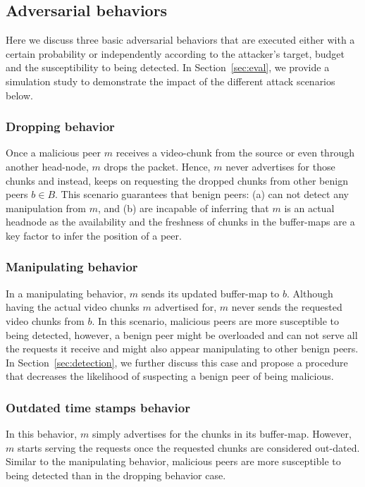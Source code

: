 \subsection{Adversarial behaviors}
Here we discuss three basic adversarial behaviors that are executed either with a certain probability or independently according to the attacker's target, budget and the susceptibility to being detected.
In Section~\ref{sec:eval}, we provide a simulation study to demonstrate the impact of the different attack scenarios below.

\subsubsection*{Dropping behavior}
Once a malicious peer $m$ receives a video-chunk from the source or even through another head-node, $m$ drops the packet. 
Hence, $m$ never advertises for those chunks and instead, keeps on requesting the dropped chunks from other benign peers $b \in B$.
This scenario guarantees that benign peers: (a) can not detect any manipulation from $m$, and (b) are incapable of inferring that $m$ is an actual headnode as the availability and the freshness of chunks in the buffer-maps are a key factor to infer the position of a peer.

\subsubsection*{Manipulating behavior}
In a manipulating behavior, $m$ sends its updated buffer-map to $b$.
Although having the actual video chunks $m$ advertised for, $m$ never sends the requested video chunks from $b$.
In this scenario, malicious peers are more susceptible to being detected, however, a benign peer might be overloaded and can not serve all the requests it receive and might also appear manipulating to other benign peers.
In Section~\ref{sec:detection}, we further discuss this case and propose a procedure that decreases the likelihood of suspecting a benign peer of being malicious.

\subsubsection*{Outdated time stamps behavior}
In this behavior, $m$ simply advertises for the chunks in its buffer-map. 
However, $m$ starts serving the requests once the requested chunks are considered out-dated.
Similar to the manipulating behavior, malicious peers are more susceptible to being detected than in the dropping behavior case.




